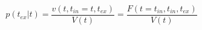 \begin{equation}
p(t_{ex}|t)  = \frac{v(t,t_{in}=t,t_{ex})}{V(t)}= \frac{F(t=t_{in},t_{in},t_{ex})}{V(t)}
\end{equation}